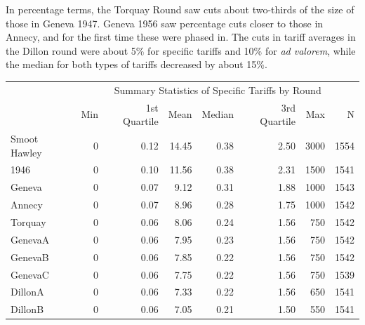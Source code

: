\documentclass[
  12pt,
]{article}
\begin{document}
In percentage terms, the Torquay Round saw cuts about two-thirds of the size of those in Geneva 1947. Geneva 1956 saw percentage cuts closer to those in Annecy, and for the first time these were phased in. The cuts in tariff averages in the Dillon round were about 5\% for specific tariffs and 10\% for \emph{ad valorem}, while the median for both types of tariffs decreased by about 15\%.

\begin{table}[!h]
\centering
\begin{tabular}[t]{lrrrrrrr}
\toprule
\multicolumn{1}{c}{\bgroup\fontsize{12}{14}\selectfont  \egroup{}} & \multicolumn{7}{c}{\bgroup\fontsize{12}{14}\selectfont Summary Statistics of Specific Tariffs by Round\egroup{}} \\
\cmidrule(l{3pt}r{3pt}){2-8}
  & Min & 1st Quartile & Mean & Median & 3rd Quartile & Max & N\\
\midrule
Smoot Hawley & 0 & 0.12 & 14.45 & 0.38 & 2.50 & 3000 & 1554\\
1946 & 0 & 0.10 & 11.56 & 0.38 & 2.31 & 1500 & 1541\\
Geneva & 0 & 0.07 & 9.12 & 0.31 & 1.88 & 1000 & 1543\\
Annecy & 0 & 0.07 & 8.96 & 0.28 & 1.75 & 1000 & 1542\\
Torquay & 0 & 0.06 & 8.06 & 0.24 & 1.56 & 750 & 1542\\
\addlinespace
GenevaA & 0 & 0.06 & 7.95 & 0.23 & 1.56 & 750 & 1542\\
GenevaB & 0 & 0.06 & 7.85 & 0.22 & 1.56 & 750 & 1542\\
GenevaC & 0 & 0.06 & 7.75 & 0.22 & 1.56 & 750 & 1539\\
DillonA & 0 & 0.06 & 7.33 & 0.22 & 1.56 & 650 & 1541\\
DillonB & 0 & 0.06 & 7.05 & 0.21 & 1.50 & 550 & 1541\\
\bottomrule
\end{tabular}
\end{table}
\end{document}
